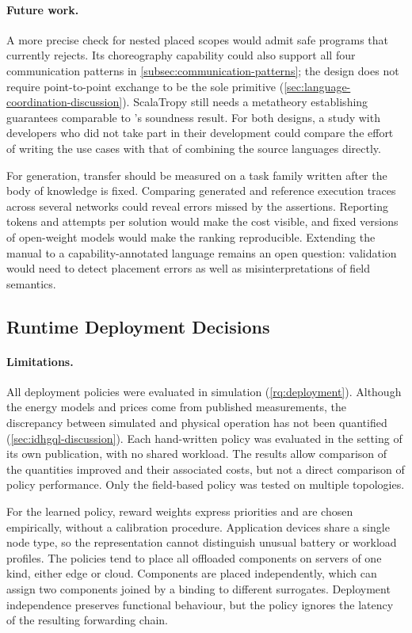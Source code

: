 \paragraph{Future work.}
A more precise check for nested placed scopes would admit safe programs that \camil currently rejects.
Its choreography capability could also support all four communication patterns in \cref{subsec:communication-patterns};
the design does not require point-to-point exchange to be the sole primitive (\cref{sec:language-coordination-discussion}).
ScalaTropy still needs a metatheory establishing guarantees comparable to \camil's soundness result.
For both designs, a study with developers who did not take part in their development
could compare the effort of writing the use cases with that of combining the source languages directly.

For generation, transfer should be measured on a task family written after the body of knowledge is fixed.
Comparing generated and reference execution traces across several networks
could reveal errors missed by the assertions.
Reporting tokens and attempts per solution would make the cost visible,
and fixed versions of open-weight models would make the ranking reproducible.
Extending the manual to a capability-annotated language remains an open question:
validation would need to detect placement errors as well as misinterpretations of field semantics.

\subsection{Runtime Deployment Decisions}
\label{subsec:limits-deployment}

\paragraph{Limitations.}
All deployment policies were evaluated in simulation (\cref{rq:deployment}).
Although the energy models and prices come from published measurements,
the discrepancy between simulated and physical operation has not been quantified (\cref{sec:idhgql-discussion}).
Each hand-written policy was evaluated in the setting of its own publication, with no shared workload.
The results allow comparison of the quantities improved and their associated costs,
but not a direct comparison of policy performance.
Only the field-based policy was tested on multiple topologies.

For the learned policy, reward weights express priorities and are chosen empirically, without a calibration procedure.
Application devices share a single node type,
so the representation cannot distinguish unusual battery or workload profiles.
The policies tend to place all offloaded components on servers of one kind, either edge or cloud.
Components are placed independently, which can assign two components joined by a binding to different surrogates.
Deployment independence preserves functional behaviour,
but the policy ignores the latency of the resulting forwarding chain.

